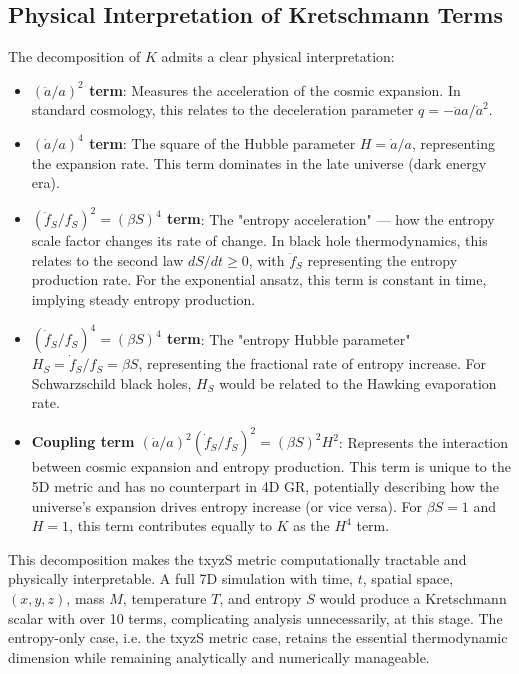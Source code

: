 \documentclass[11pt,a4paper]{article}
\begin{document}
\subsection{Physical Interpretation of Kretschmann Terms}

The decomposition of $K$ admits a clear physical interpretation:

\begin{itemize}
    \item \textbf{$\left(\ddot{a}/a\right)^2$ term}: Measures the acceleration 
          of the cosmic expansion. In standard cosmology, this relates to 
          the deceleration parameter $q = -\ddot{a}a/\dot{a}^2$.

    \item \textbf{$\left(\dot{a}/a\right)^4$ term}: The square of the Hubble 
          parameter $H = \dot{a}/a$, representing the expansion rate. This term
          dominates in the late universe (dark energy era).

    \item \textbf{$\left(\ddot{f}_S/f_S\right)^2 = (\beta S)^4$ term}: The 
          "entropy acceleration" — how the entropy scale factor changes its 
          rate of change. In black hole thermodynamics, this relates to the 
          second law $dS/dt \geq 0$, with $\ddot{f}_S$ representing the 
          entropy production rate. For the exponential ansatz, this term is 
          constant in time, implying steady entropy production.

    \item \textbf{$\left(\dot{f}_S/f_S\right)^4 = (\beta S)^4$ term}: The 
          "entropy Hubble parameter" $H_S = \dot{f}_S/f_S = \beta S$, 
          representing the fractional rate of entropy increase. For 
          Schwarzschild black holes, $H_S$ would be related to the Hawking 
          evaporation rate.

    \item \textbf{Coupling term $\left(\dot{a}/a\right)^2 \left(\dot{f}_S/f_S\right)^2 = (\beta S)^2 H^2$}: 
          Represents the interaction between cosmic expansion and entropy 
          production. This term is unique to the 5D metric and has no 
          counterpart in 4D GR, potentially describing how the universe's 
          expansion drives entropy increase (or vice versa). For $\beta S = 1$ 
          and $H = 1$, this term contributes equally to $K$ as the $H^4$ term.
\end{itemize}

This decomposition makes the txyzS metric computationally tractable 
and physically interpretable. A full 7D simulation with time, $t$, spatial space, $(x,y,z)$, mass $M$, temperature 
$T$, and entropy $S$ would produce a Kretschmann scalar with over 10 terms, 
complicating analysis unnecessarily, at this stage. The entropy-only case, i.e. the txyzS metric case, retains the 
essential thermodynamic dimension while remaining analytically and 
numerically manageable.
\end{document}
